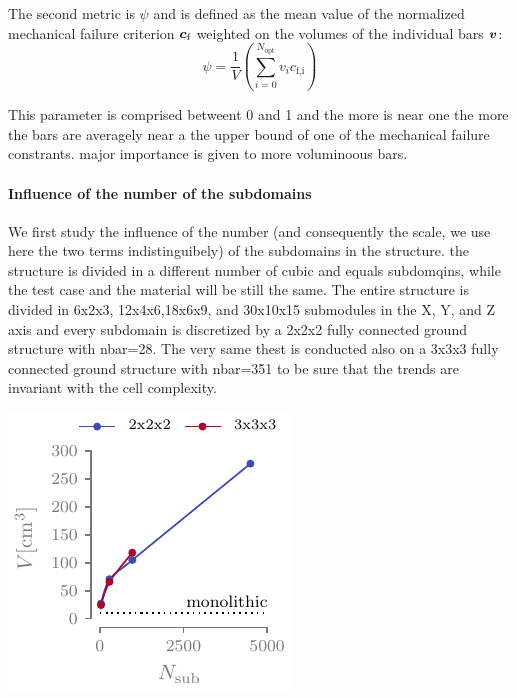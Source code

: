 The second metric is $\psi$ and is defined as the mean value of the normalized mechanical failure criterion $\bm{c}_\text{f}$ weighted on the volumes of the individual bars $\bm{v}$:
\begin{equation}
    \psi = \frac{1}{V} \left( \sum_{i=0}^{N_\text{opt}} v_i c_\text{f,i} \right)
\end{equation}

This parameter is comprised betweent 0 and 1 and the more is near one the more the bars are averagely near a the upper bound of one of the mechanical failure constrants. major importance is given to more voluminoous bars.

\paragraph{Influence of the number of the subdomains}
We first study the influence of the number (and consequently the scale, we use here the two terms indistinguibely) of the subdomains in the structure. the structure is divided in a different number of cubic and equals subdomqins, while the test case and the material will be still the same. The entire structure is divided in 6x2x3, 12x4x6,18x6x9, and 30x10x15 submodules in the X, Y, and Z axis and every subdomain is discretized by a 2x2x2 fully connected ground structure with nbar=28. The very same thest is conducted also on a 3x3x3 fully connected ground structure with nbar=351 to be sure that the trends are invariant with the cell complexity.

\begin{marginfigure}
    \centering
    \includegraphics{figures/05_cellular_opt/00_module_scale_tab/scale_tab_v.pdf}
    \caption{}
    \label{fig:05_scale_v}
\end{marginfigure}

